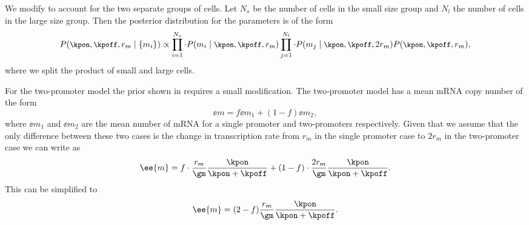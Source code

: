 We modify  to account for the two separate groups of
cells. Let $N_s$ be the number of cells in the small size group and $N_l$ the
number of cells in the large size group. Then the posterior distribution for the
parameters is of the form
\begin{equation}
  \small
P(\kpon, \kpoff, r_m \mid \{m_i\}) \propto
  \prod_{i=1}^{N_s} \cdot P(m_i \mid \kpon, \kpoff, r_m)
  \prod_{j=1}^{N_l} \cdot P(m_j \mid \kpon, \kpoff, 2 r_m)
  P(\kpon, \kpoff, r_m),
  \label{seq_bayes_sample_double}
\end{equation}
where we split the product of small and large cells.

For the two-promoter model the prior shown in  requires
a small modification. The two-promoter model has a mean mRNA copy number of
the form
\begin{equation}
  \ee{m} = f \ee{m}_1 + (1 - f) \ee{m}_2,
  \label{seq_mean_m_double}
\end{equation}
where $\ee{m}_1$ and $\ee{m}_2$ are the mean number of mRNA for a single
promoter and two-promoters respectively. Given that we assume that the only
difference between these two cases is the change in transcription rate from
$r_m$ in the single promoter case to $2 r_m$ in the two-promoter case we can
write  as
\begin{equation}
  \ee{m} = f \cdot {r_m \over \gm} {\kpon \over \kpon + \kpoff} +
      (1 -f) \cdot {2 r_m \over \gm} {\kpon \over \kpon + \kpoff}.
\end{equation}
This can be simplified to
\begin{equation}
  \ee{m} = (2 - f) {r_m \over \gm} {\kpon \over \kpon + \kpoff}.
  \label{seq_mean_m_double_rates}
\end{equation}

